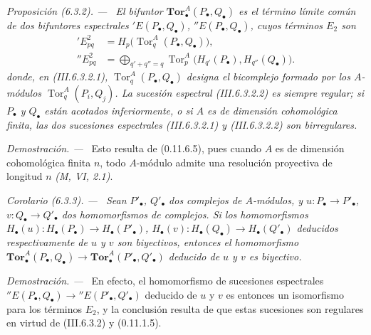 \documentclass[10pt,oneside]{book}
\newcommand{\sref}[2][]{\textup{(#2)}}
\newenvironment{proposition}[1][]{\par\medskip\noindent\itshape Proposición (#1). ---\ }{\par}
\newenvironment{corollary}[1][]{\par\medskip\noindent\itshape Corolario (#1). ---\ }{\par}
\newenvironment{proof}{\par\medskip\noindent\textit{Demostración. ---\ }}{\par}
\begin{document}
\begin{proposition}[6.3.2]
\label{III.6.3.2}
El bifuntor $\mathbf{Tor}_\bullet^A(P_\bullet,Q_\bullet)$ es el término
límite común de dos bifuntores espectrales
$'E(P_\bullet,Q_\bullet)$, $''E(P_\bullet,Q_\bullet)$, cuyos términos $E_2$
son
\begin{align}
  'E^2_{pq}
    &=H_p\bigl(\operatorname{Tor}_q^A(P_\bullet,Q_\bullet)\bigr),
    \tag{6.3.2.1}\label{III.6.3.2.1}\\
  ''E^2_{pq}
    &=\bigoplus_{q'+q''=q}
      \operatorname{Tor}_p^A\bigl(H_{q'}(P_\bullet),H_{q''}(Q_\bullet)\bigr).
    \tag{6.3.2.2}\label{III.6.3.2.2}
\end{align}
donde, en \sref{III.6.3.2.1},
$\operatorname{Tor}_q^A(P_\bullet,Q_\bullet)$ designa el
bicomplejo formado por los $A$-módulos $\operatorname{Tor}_q^A(P_i,Q_j)$. La
sucesión espectral \sref{III.6.3.2.2} es siempre regular; si $P_\bullet$ y
$Q_\bullet$
están acotados inferiormente, o si $A$ es de dimensión cohomológica finita,
las dos sucesiones espectrales \sref{III.6.3.2.1} y
\sref{III.6.3.2.2} son birregulares.
\end{proposition}

\begin{proof}
Esto resulta de \sref[0]{0.11.6.5}, pues cuando $A$ es de dimensión
cohomológica
finita $n$, todo $A$-módulo admite una resolución proyectiva de longitud $n$
\emph{(M, VI, 2.1)}.
\end{proof}

\begin{corollary}[6.3.3]
\label{III.6.3.3}
Sean $P'_\bullet$, $Q'_\bullet$ dos complejos de $A$-módulos, y
$u:P_\bullet\to P'_\bullet$, $v:Q_\bullet\to Q'_\bullet$ dos homomorfismos
de complejos. Si los homomorfismos
$H_\bullet(u):H_\bullet(P_\bullet)\to H_\bullet(P'_\bullet)$,
$H_\bullet(v):H_\bullet(Q_\bullet)\to H_\bullet(Q'_\bullet)$ deducidos
respectivamente de $u$ y $v$ son biyectivos, entonces el homomorfismo
$\mathbf{Tor}_\bullet^A(P_\bullet,Q_\bullet)\to
\mathbf{Tor}_\bullet^A(P'_\bullet,Q'_\bullet)$ deducido de $u$ y $v$ es
biyectivo.
\end{corollary}

\begin{proof}
En efecto, el homomorfismo de sucesiones espectrales
$''E(P_\bullet,Q_\bullet)\to''E(P'_\bullet,Q'_\bullet)$ deducido de $u$ y $v$
es entonces un isomorfismo para los términos $E_2$, y la conclusión resulta
de que estas sucesiones son regulares en virtud de \sref{III.6.3.2} y
\sref[0]{0.11.1.5}.
\end{proof}
\end{document}
